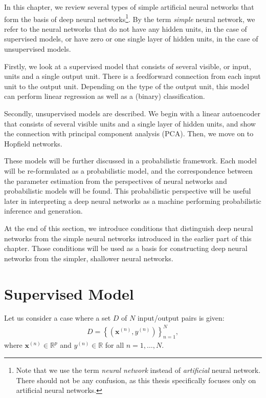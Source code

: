 \documentclass[dissertation,nocontribution,draft*]{aaltoseries}
\newcommand{\vect}[1]{\mathbf{#1}}
\newcommand{\vx}[0]{\vect{x}}
\newcommand{\RR}[0]{\mathbb{R}}
\begin{document}
In this chapter, we review several types of simple
artificial neural networks that form the basis of deep
neural networks\footnote{Note that we use the term
\textit{neural network} instead of \textit{artificial}
neural network.  There should not be any confusion, as this
thesis specifically focuses only on artificial neural
networks.}. By the term \textit{simple} neural network, we
refer to the neural networks that do not have any hidden
units, in the case of supervised models, or have zero or one
single layer of hidden units, in the case of unsupervised
models.

Firstly, we look at a supervised model that consists of
several visible, or input, units and a single output
unit. There is a feedforward connection from each input unit to
the output unit.  Depending on the type of the output unit,
this model can perform linear regression as well as a
(binary) classification.

Secondly, unsupervised models are described. We begin with a
linear autoencoder that consists of several visible units
and a single layer of hidden units, and show the connection
with principal component analysis (PCA). Then, we move on to
Hopfield networks.

These models will be further discussed in a probabilistic
framework.  Each model will be re-formulated as a
probabilistic model, and the correspondence between the
parameter estimation from the perspectives of neural
networks and probabilistic models will be found. This
probabilistic perspective will be useful later in
interpreting a deep neural networks as a machine
performing probabilistic inference and generation.

At the end of this section, we introduce conditions
that distinguish deep neural networks from the simple neural
networks introduced in the earlier part of this chapter.
Those conditions will be used as a basis for constructing deep
neural networks from the simpler, shallower neural networks.

\section{Supervised Model}
\label{sec:supervised_model}

Let us consider a case where a set $D$ of $N$ input/output
pairs is given:
\begin{align}
    \label{eq:set_disc}
D=\left\{ \left( \vx^{(n)}, y^{(n)}
\right) \right\}_{n=1}^N,
\end{align}
where $\vx^{(n)} \in \RR^p$ and $y^{(n)} \in \RR$ for all
$n=1,\dots,N$.
\end{document}
